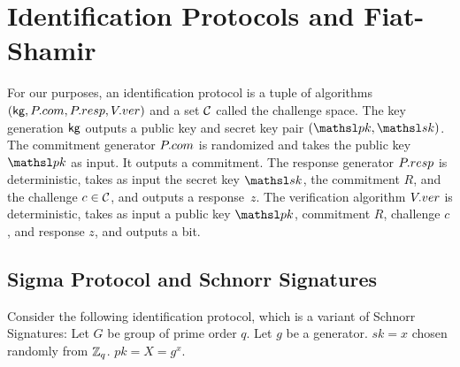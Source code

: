 \section{Identification Protocols and Fiat-Shamir}
\label{sec:idprots}


For our purposes, an identification protocol is a tuple of algorithms
$(\textsf{kg},P.com,P.resp,V.ver)$ and a set ${\cal C}$ called the challenge space. 
The key generation $\textsf{kg}$ outputs a public key and secret key pair
$(\pk,\sk)$. The commitment generator $P.com$ is randomized and takes the
public key $\pk$ as input. It outputs a commitment. The response generator $P.resp$ is
deterministic, takes as input the secret key $\sk$, the commitment $R$, and the
challenge $c \in {\cal C}$, and outputs a response~$z$. The verification
algorithm $V.ver$ is deterministic, takes as input a public key $\pk$, 
commitment $R$, challenge $c$, and response $z$, and outputs a bit.  






\subsection{Sigma Protocol and Schnorr Signatures}
Consider the following identification protocol, which is a variant of Schnorr Signatures: Let $G$ be group of prime order $q$.  Let $g$ be a generator. $sk = x$ chosen randomly from ${{\mathbb Z}}_q$. $pk = X = g^x$.\\

\\

